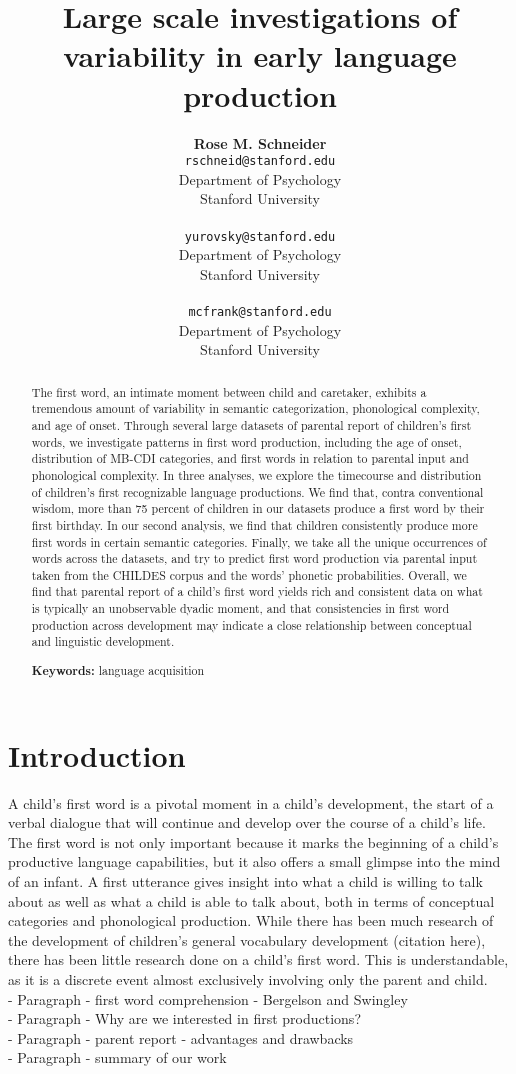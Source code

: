\documentclass[10pt,letterpaper]{article}
\title{Large scale investigations of variability in early language production}
\author{{\large \bf Rose M. Schneider} \\ \texttt{rschneid@stanford.edu}\\ Department of Psychology \\ Stanford University \\ 
\And {\large \bf Dan Yurovsky} \\ \texttt{yurovsky@stanford.edu} \\ Department of Psychology \\ Stanford University \\ 
\And {\large \bf Michael C. Frank} \\ \texttt{mcfrank@stanford.edu} \\ Department of Psychology \\ Stanford University \\ }
\begin{document}
\maketitle


\begin{abstract}
The first word, an intimate moment between child and caretaker, exhibits a tremendous amount of variability in semantic categorization, phonological complexity, and age of onset. Through several large datasets of parental report of children's first words, we investigate patterns in first word production, including the age of onset, distribution of MB-CDI categories, and first words in relation to parental input and phonological complexity. In three analyses, we explore the timecourse and distribution of children's first recognizable language productions. We find that, contra conventional wisdom, more than 75 percent of children in our datasets produce a first word by their first birthday. In our second analysis, we find that children consistently produce more first words in certain semantic categories. Finally, we take all the unique occurrences of words across the datasets, and try to predict first word production via parental input taken from the CHILDES corpus and the words' phonetic probabilities. Overall, we find that parental report of a child's first word yields rich and consistent data on what is typically an unobservable dyadic moment, and that consistencies in first word production across development may indicate a close relationship between conceptual and linguistic development.

\textbf{Keywords:}
language acquisition
\end{abstract}

\section{Introduction}
A child's first word is a pivotal moment in a child's development, the start of a verbal dialogue that will continue and develop over the course of a child's life. The first word is not only important because it marks the beginning of a child's productive language capabilities, but it also offers a small glimpse into the mind of an infant. A first utterance gives insight into what a child is willing to talk about as well as what a child is able to talk about, both in terms of conceptual categories and phonological production. While there has been much research of the development of children's general vocabulary development (citation here), there has been little research done on a child's first word. This is understandable, as it is a discrete event almost exclusively involving only the parent and child. \\
- Paragraph - first word comprehension - Bergelson and Swingley\\
- Paragraph - Why are we interested in first productions?\\
- Paragraph - parent report - advantages and drawbacks \\
- Paragraph - summary of our work\\
\end{document}

